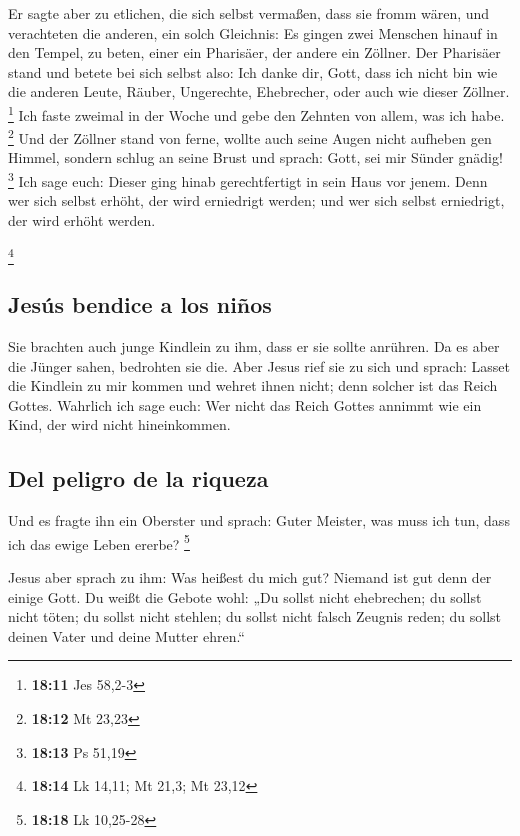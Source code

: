  Er sagte aber zu etlichen, die sich selbst vermaßen, dass
sie fromm wären, und verachteten die anderen, ein solch Gleichnis:
 Es gingen zwei Menschen hinauf in den Tempel, zu beten,
einer ein Pharisäer, der andere ein Zöllner.  Der
Pharisäer stand und betete bei sich selbst also: Ich danke dir, Gott,
dass ich nicht bin wie die anderen Leute, Räuber, Ungerechte,
Ehebrecher, oder auch wie dieser Zöllner. \footnote{\textbf{18:11} Jes
  58,2-3}  Ich faste zweimal in der Woche und gebe den
Zehnten von allem, was ich habe. \footnote{\textbf{18:12} Mt 23,23}
 Und der Zöllner stand von ferne, wollte auch seine Augen
nicht aufheben gen Himmel, sondern schlug an seine Brust und sprach:
Gott, sei mir Sünder gnädig! \footnote{\textbf{18:13} Ps 51,19}
 Ich sage euch: Dieser ging hinab gerechtfertigt in sein
Haus vor jenem. Denn wer sich selbst erhöht, der wird erniedrigt werden;
und wer sich selbst erniedrigt, der wird erhöht werden.

\footnote{\textbf{18:14} Lk 14,11; Mt 21,3; Mt 23,12}

\hypertarget{jesuxfas-bendice-a-los-niuxf1os}{%
\subsection{Jesús bendice a los
niños}\label{jesuxfas-bendice-a-los-niuxf1os}}

 Sie brachten auch junge Kindlein zu ihm, dass er sie
sollte anrühren. Da es aber die Jünger sahen, bedrohten sie die.
 Aber Jesus rief sie zu sich und sprach: Lasset die
Kindlein zu mir kommen und wehret ihnen nicht; denn solcher ist das
Reich Gottes.  Wahrlich ich sage euch: Wer nicht das
Reich Gottes annimmt wie ein Kind, der wird nicht hineinkommen.

\hypertarget{del-peligro-de-la-riqueza}{%
\subsection{Del peligro de la riqueza}\label{del-peligro-de-la-riqueza}}

 Und es fragte ihn ein Oberster und sprach: Guter
Meister, was muss ich tun, dass ich das ewige Leben ererbe? \footnote{\textbf{18:18}
  Lk 10,25-28}

 Jesus aber sprach zu ihm: Was heißest du mich gut?
Niemand ist gut denn der einige Gott.  Du weißt die
Gebote wohl: „Du sollst nicht ehebrechen; du sollst nicht töten; du
sollst nicht stehlen; du sollst nicht falsch Zeugnis reden; du sollst
deinen Vater und deine Mutter ehren.``

